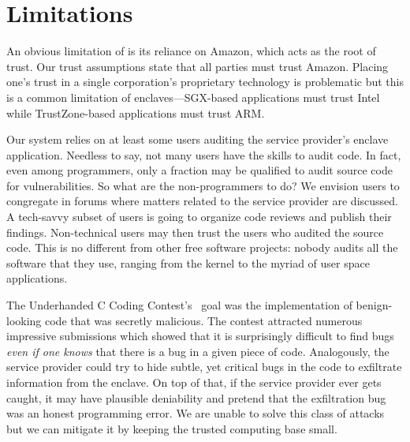 \section{Limitations}%
\label{sec:limitations}

An obvious limitation of \tool{} is its reliance on Amazon, which acts as the
root of trust.  Our trust assumptions state that all parties must trust Amazon.
Placing one's trust in a single corporation's proprietary technology is
problematic but this is a common limitation of enclaves---SGX-based applications
must trust Intel while TrustZone-based applications must trust ARM.

Our system relies on at least some users auditing the service provider's enclave
application.  Needless to say, not many users have the skills to audit code.  In
fact, even among programmers, only a fraction may be qualified to audit source
code for vulnerabilities.  So what are the non-programmers to do?  We envision
users to congregate in forums where matters related to the service provider are
discussed.  A tech-savvy subset of users is going to organize code reviews and
publish their findings.  Non-technical users may then trust the users who
audited the source code.  This is no different from other free software
projects: nobody audits all the software that they use, ranging from the kernel
to the myriad of user space applications.

The Underhanded C Coding Contest's~\cite{underhanded-c} goal was the
implementation of benign-looking code that was secretly malicious.  The contest
attracted numerous impressive submissions which showed that it is surprisingly
difficult to find bugs \emph{even if one knows} that there is a bug in a given
piece of code.  Analogously, the service provider could try to hide subtle, yet
critical bugs in the code to exfiltrate information from the enclave.  On top of
that, if the service provider ever gets caught, it may have plausible
deniability and pretend that the exfiltration bug was an honest programming
error.  We are unable to solve this class of attacks but we can mitigate it
by keeping the trusted computing base small.
